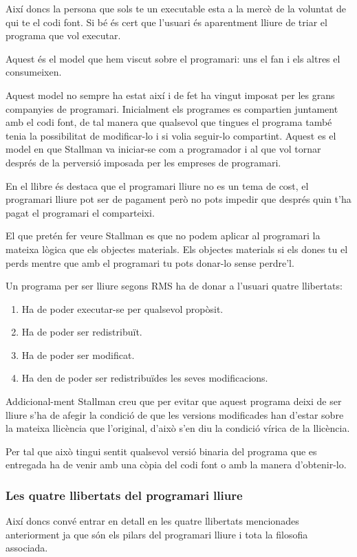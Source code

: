 \documentclass[a4paper,10pt]{scrartcl}
\begin{document}
Així doncs la persona que sols te un executable esta a la mercè de la voluntat de qui
te el codi font. Si bé és cert que l'usuari és aparentment lliure de triar el programa
que vol executar.

Aquest és el model que hem viscut sobre el programari: uns el fan i els altres el 
consumeixen.

Aquest model no sempre ha estat així i de fet ha vingut imposat per les grans
companyies de programari. Inicialment els programes es compartien juntament
amb el codi font, de tal manera que qualsevol que tingues el programa també tenia
la possibilitat de modificar-lo i si volia seguir-lo compartint. Aquest es el model
en que Stallman va iniciar-se com a programador i al que vol tornar després
de la perversió imposada per les empreses de programari.

En el llibre és destaca que el programari lliure no es un tema de cost,
el programari lliure pot ser de pagament però no pots impedir que després quin
t'ha pagat el programari el comparteixi.

El que pretén fer veure Stallman es que no podem aplicar al programari
la mateixa lògica que els objectes materials. Els objectes materials si els
dones tu el perds mentre que amb el programari tu pots donar-lo sense
perdre'l.

Un programa per ser lliure segons RMS ha de donar a l'usuari quatre llibertats:

\begin{enumerate}
  \item Ha de poder executar-se per qualsevol propòsit.
  \item Ha de poder ser redistribuït.
  \item Ha de poder ser modificat.
  \item Ha den de poder ser redistribuïdes les seves modificacions.
\end{enumerate}
  
Addicional-ment Stallman creu que per evitar que aquest programa
deixi de ser lliure s'ha de afegir la condició de que les versions
modificades han d'estar sobre la mateixa llicència que l'original,
d'això s'en diu la condició vírica de la llicència.

Per tal que això tingui sentit qualsevol versió binaria del programa
que es entregada ha de venir amb una còpia del codi font o amb la
manera d'obtenir-lo.

\subsubsection{Les quatre llibertats del programari lliure}
Així doncs convé entrar en detall en les quatre llibertats mencionades
anteriorment ja que són els pilars del programari lliure i tota
la filosofia associada.
\end{document}
